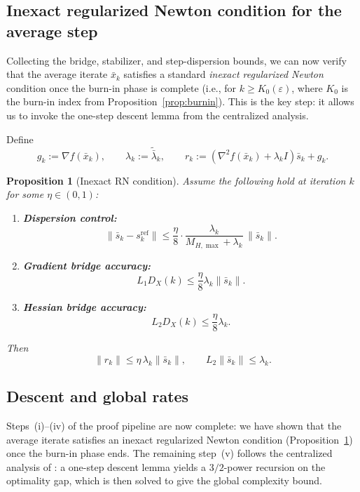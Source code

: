 \documentclass[11pt,a4paper]{article}
\newtheorem{proposition}[theorem]{Proposition}
\begin{document}
\subsection{Inexact regularized Newton condition for the average step}\label{ssec:inexact}
Collecting the bridge, stabilizer, and step-dispersion bounds, we can
now verify that the average iterate $\bar x_k$ satisfies a standard
\emph{inexact regularized Newton} condition once the burn-in phase
is complete (i.e., for $k\ge K_0(\varepsilon)$, where $K_0$ is the
burn-in index from Proposition~\ref{prop:burnin}).
This is the key step: it allows us to invoke the one-step descent
lemma from the centralized analysis.

Define
\[
g_k:=\nabla f(\bar x_k),\qquad
\lambda_k:=\tilde{\bar\lambda}_k,\qquad
r_k:=(\nabla^2 f(\bar x_k)+\lambda_k I)\bar s_k+g_k.
\]

\begin{proposition}[Inexact RN condition]\label{prop:inexact-rn}
Assume the following hold at iteration $k$ for some $\eta\in(0,1)$:
\begin{enumerate}[leftmargin=1.2em,itemsep=2pt]
\item \textbf{Dispersion control:}
\[
\|\bar s_k-s_k^{\mathrm{ref}}\|\le \frac{\eta}{8}\cdot \frac{\lambda_k}{M_{H,\max}+\lambda_k}\,\|\bar s_k\|.
\]
\item \textbf{Gradient bridge accuracy:}
\[
L_1D_X(k)\le \frac{\eta}{8}\lambda_k\|\bar s_k\|.
\]
\item \textbf{Hessian bridge accuracy:}
\[
L_2D_X(k)\le \frac{\eta}{8}\lambda_k.
\]
\end{enumerate}
Then
\[
\|r_k\|\le \eta\,\lambda_k\|\bar s_k\|,
\qquad
L_2\|\bar s_k\|\le \lambda_k.
\]
\end{proposition}

\subsection{Descent and global rates}\label{ssec:descent}
Steps~(i)--(iv) of the proof pipeline are now complete: we have shown
that the average iterate satisfies an inexact regularized Newton
condition (Proposition~\ref{prop:inexact-rn}) once the burn-in phase
ends.
The remaining step~(v) follows the centralized analysis of
\citet{mishchenko2023rn}: a one-step descent lemma yields a
$3/2$-power recursion on the optimality gap, which is then solved to
give the global complexity bound.
\end{document}
